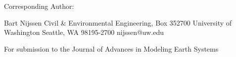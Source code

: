 Corresponding Author: 

Bart Nijssen
Civil & Environmental Engineering, Box 352700
University of Washington
Seattle, WA 98195-2700
nijssen@uw.edu

For submission to the Journal of Advances in Modeling Earth Systems
  